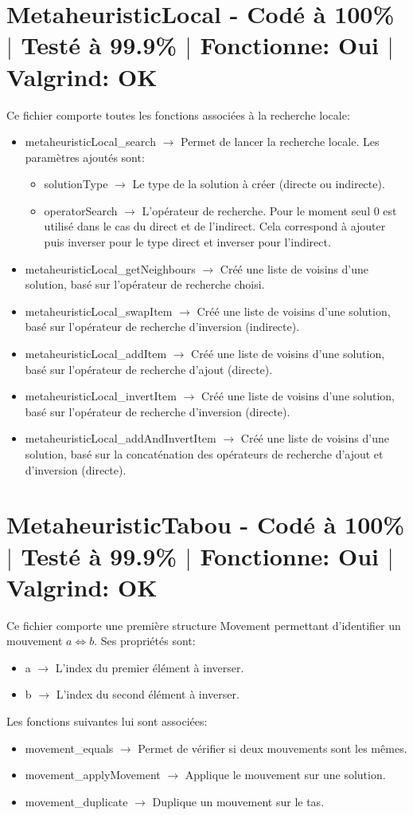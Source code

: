 \documentclass{EPUProjetPeiP}
\newcommand{\comp}[5]{
	\section[#1]{#1 {\small - Codé à #2\% $\vert$ Testé à #3\% $\vert$ Fonctionne: #4 $\vert$ Valgrind: #5}}
}
\begin{document}
\comp{MetaheuristicLocal}{100}{99.9}{Oui}{OK}
Ce fichier comporte toutes les fonctions associées à la recherche locale:
\begin{itemize}
	\item metaheuristicLocal\_search $\longrightarrow$ Permet de lancer la recherche locale. Les paramètres ajoutés sont:
	\begin{itemize}
		\item solutionType $\longrightarrow$ Le type de la solution à créer (directe ou indirecte).
		\item operatorSearch $\longrightarrow$ L'opérateur de recherche. Pour le moment seul 0 est utilisé dans le cas du direct et de l'indirect. Cela correspond à ajouter puis inverser pour le type direct et inverser pour l'indirect.
	\end{itemize}
	\item metaheuristicLocal\_getNeighbours $\longrightarrow$ Créé une liste de voisins d'une solution, basé sur l'opérateur de recherche choisi.
	\item metaheuristicLocal\_swapItem $\longrightarrow$ Créé une liste de voisins d'une solution, basé sur l'opérateur de recherche d'inversion (indirecte).
	\item metaheuristicLocal\_addItem $\longrightarrow$ Créé une liste de voisins d'une solution, basé sur l'opérateur de recherche d'ajout (directe).
	\item metaheuristicLocal\_invertItem $\longrightarrow$ Créé une liste de voisins d'une solution, basé sur l'opérateur de recherche d'inversion (directe).
	\item metaheuristicLocal\_addAndInvertItem $\longrightarrow$ Créé une liste de voisins d'une solution, basé sur la concaténation des opérateurs de recherche d'ajout et d'inversion (directe).
\end{itemize}

\comp{MetaheuristicTabou}{100}{99.9}{Oui}{OK}
Ce fichier comporte une première structure Movement permettant d'identifier un mouvement $a\Leftrightarrow b$. Ses propriétés sont:
\begin{itemize}
	\item a $\longrightarrow$ L'index du premier élément à inverser.
	\item b $\longrightarrow$ L'index du second élément à inverser.\\
\end{itemize}

Les fonctions suivantes lui sont associées:
\begin{itemize}
	\item movement\_equals $\longrightarrow$ Permet de vérifier si deux mouvements sont les mêmes.
	\item movement\_applyMovement $\longrightarrow$ Applique le mouvement sur une solution.
	\item movement\_duplicate $\longrightarrow$ Duplique un mouvement sur le tas.\\
\end{itemize}
\end{document}
